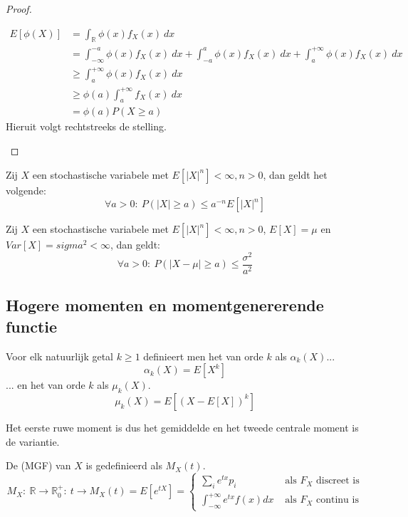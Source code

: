 \documentclass[main.tex]{subfiles}
\begin{document}
\begin{st}
\begin{proof}
\begin{itemize}
\begin{enumerate}
\begin{align*}
          E[\phi(X)]
          &= \int_{\mathbb{R}}\phi(x)f_{X}(x)\ dx\\
          &= \int_{-\infty}^{-a}\phi(x)f_{X}(x)\ dx + \int_{-a}^{a}\phi(x)f_{X}(x)\ dx + \int_{a}^{+\infty}\phi(x)f_{X}(x)\ dx\\
          &\ge \int_{a}^{+\infty}\phi(x)f_{X}(x)\ dx\\
          &\ge \phi(a)\int_{a}^{+\infty}f_{X}(x)\ dx\\
          &= \phi(a)P(X \ge a)
        \end{align*}
        Hieruit volgt rechtstreeks de stelling.        
      \end{enumerate}
    \end{itemize}
  \end{proof}
\end{st}

\begin{gev}
  Zij $X$ een stochastische variabele met $E[|X|^{n}] < \infty, n>0$, dan geldt het volgende:
  \[ \forall a> 0:\ P(|X| \ge a) \le a^{-n}E[|X|^{n}] \]
\end{gev}
\begin{gev}
  Zij $X$ een stochastische variabele met $E[|X|^{n}] < \infty, n>0$, $E[X] = \mu$ en $Var[X] = sigma^{2} < \infty$, dan geldt:
  \[ \forall a > 0:\ P(|X-\mu| \ge a) \le \frac{\sigma^{2}}{a^{2}} \]
\end{gev}

\subsection{Hogere momenten en momentgenererende functie}
\label{sec:hogere-momenten-en}

\begin{de}
  Voor elk natuurlijk getal $k\ge 1$ definieert men het  van orde $k$ als $\alpha_{k}(X)$...
  \[ \alpha_{k}(X) =E[X^{k}] \]
  ... en het  van orde $k$ als $\mu_{k}(X)$.
  \[ \mu_{k}(X) = E[(X-E[X])^{k}] \]
\end{de}

\begin{opm}
  Het eerste ruwe moment is dus het gemiddelde en het tweede centrale moment is de variantie.
\end{opm}

\begin{de}
  De  (MGF) van $X$ is gedefinieerd als $M_{X}(t)$.
  \[
  M_{X}:\ \mathbb{R} \rightarrow \mathbb{R}^{+}_{0}:\ t \rightarrow M_{X}(t) = E[e^{tX}]
  = \left\{
    \begin{array}{cl}
      \sum_{i}e^{tx}p_{i} & \text{ als } F_{X} \text{ discreet is}\\
      \int_{-\infty}^{+\infty}e^{tx}f(x)dx & \text{ als } F_{X} \text{ continu is}
    \end{array}
    \right.
  \]
\end{de}
\end{document}
